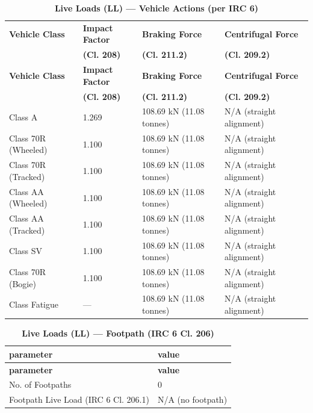 \documentclass[12pt,a4paper]{report}
\numberwithin{table}{chapter}
\numberwithin{figure}{chapter}
\begin{document}
\vspace{1em}
\begin{longtable}{|L{4.2cm}|C{2.6cm}|C{4.3cm}|C{4.4cm}|}
\caption{\textbf{Live Loads (LL) --- Vehicle Actions (per IRC 6)}}
\hline
\textbf{Vehicle Class} & \textbf{Impact Factor} & \textbf{Braking Force} & \textbf{Centrifugal Force} \\
 & \textbf{(Cl. 208)} & \textbf{(Cl. 211.2)} & \textbf{(Cl. 209.2)} \\
\hline
\endfirsthead

\hline
\textbf{Vehicle Class} & \textbf{Impact Factor} & \textbf{Braking Force} & \textbf{Centrifugal Force} \\
 & \textbf{(Cl. 208)} & \textbf{(Cl. 211.2)} & \textbf{(Cl. 209.2)} \\
\hline
\endhead
Class A & 1.269 & 108.69 kN (11.08 tonnes) & N/A (straight alignment) \\[6pt]
\hline
Class 70R (Wheeled) & 1.100 & 108.69 kN (11.08 tonnes) & N/A (straight alignment) \\[6pt]
\hline
Class 70R (Tracked) & 1.100 & 108.69 kN (11.08 tonnes) & N/A (straight alignment) \\[6pt]
\hline
Class AA (Wheeled) & 1.100 & 108.69 kN (11.08 tonnes) & N/A (straight alignment) \\[6pt]
\hline
Class AA (Tracked) & 1.100 & 108.69 kN (11.08 tonnes) & N/A (straight alignment) \\[6pt]
\hline
Class SV & 1.100 & 108.69 kN (11.08 tonnes) & N/A (straight alignment) \\[6pt]
\hline
Class 70R (Bogie) & 1.100 & 108.69 kN (11.08 tonnes) & N/A (straight alignment) \\[6pt]
\hline
Class Fatigue & --- & 108.69 kN (11.08 tonnes) & N/A (straight alignment) \\[6pt]
\hline

\end{longtable}

\vspace{1em}
\begin{longtable}{|L{5.5cm}|p{10.0cm}|}
\caption{\textbf{Live Loads (LL) --- Footpath (IRC 6 Cl. 206)}}
\hline
\textbf{parameter} & \textbf{value} \\
\hline
\endfirsthead

\hline
\textbf{parameter} & \textbf{value} \\
\hline
\endhead
\textnormal{No. of Footpaths} & 0 \\[6pt]
\hline
\textnormal{Footpath Live Load (IRC 6 Cl. 206.1)} & N/A (no footpath) \\[6pt]
\hline
\end{longtable}
\end{document}
